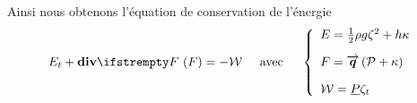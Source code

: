 Ainsi nous obtenons l'équation de conservation de l'énergie
\begin{equation}
	E_t + \div[F] = - \mathcal{W} \hspace{5mm}\text{avec}\hspace{5mm} \left\{
\begin{array}{l}
	E = \frac{1}{2}\rho g \zeta^2 + h\kappa\\[1em]
	F = \boldvec{q}\left(\mathcal{P} + \kappa\right)\\[1em]
	\mathcal{W} = \underline{P} \zeta_t  
\end{array}\right.\label{eq:energysw}
\end{equation}

